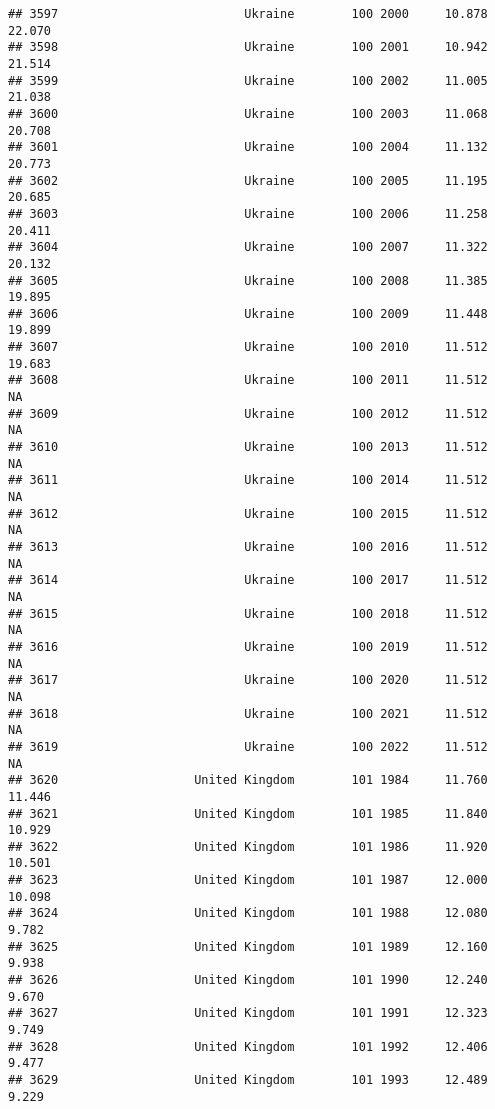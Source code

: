 \documentclass[
]{article}
\begin{document}
\begin{verbatim}
## 3597                          Ukraine        100 2000     10.878     22.070
## 3598                          Ukraine        100 2001     10.942     21.514
## 3599                          Ukraine        100 2002     11.005     21.038
## 3600                          Ukraine        100 2003     11.068     20.708
## 3601                          Ukraine        100 2004     11.132     20.773
## 3602                          Ukraine        100 2005     11.195     20.685
## 3603                          Ukraine        100 2006     11.258     20.411
## 3604                          Ukraine        100 2007     11.322     20.132
## 3605                          Ukraine        100 2008     11.385     19.895
## 3606                          Ukraine        100 2009     11.448     19.899
## 3607                          Ukraine        100 2010     11.512     19.683
## 3608                          Ukraine        100 2011     11.512         NA
## 3609                          Ukraine        100 2012     11.512         NA
## 3610                          Ukraine        100 2013     11.512         NA
## 3611                          Ukraine        100 2014     11.512         NA
## 3612                          Ukraine        100 2015     11.512         NA
## 3613                          Ukraine        100 2016     11.512         NA
## 3614                          Ukraine        100 2017     11.512         NA
## 3615                          Ukraine        100 2018     11.512         NA
## 3616                          Ukraine        100 2019     11.512         NA
## 3617                          Ukraine        100 2020     11.512         NA
## 3618                          Ukraine        100 2021     11.512         NA
## 3619                          Ukraine        100 2022     11.512         NA
## 3620                   United Kingdom        101 1984     11.760     11.446
## 3621                   United Kingdom        101 1985     11.840     10.929
## 3622                   United Kingdom        101 1986     11.920     10.501
## 3623                   United Kingdom        101 1987     12.000     10.098
## 3624                   United Kingdom        101 1988     12.080      9.782
## 3625                   United Kingdom        101 1989     12.160      9.938
## 3626                   United Kingdom        101 1990     12.240      9.670
## 3627                   United Kingdom        101 1991     12.323      9.749
## 3628                   United Kingdom        101 1992     12.406      9.477
## 3629                   United Kingdom        101 1993     12.489      9.229

\end{verbatim}
\end{document}

